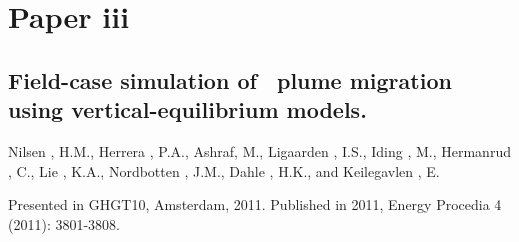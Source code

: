 \pagebreak

\chapter*{Paper iii}


\section{Field-case simulation of \coo\ plume migration using vertical-equilibrium models.}\label{paperiii}

\noindent Nilsen , H.M., Herrera , P.A., Ashraf, M., Ligaarden , I.S., Iding , M., Hermanrud ,
C., Lie , K.A., Nordbotten , J.M., Dahle , H.K., and Keilegavlen , E.


\noindent Presented in GHGT10, Amsterdam, 2011. Published in 2011, Energy Procedia 4 (2011): 3801-3808.

\cleardoublepage


